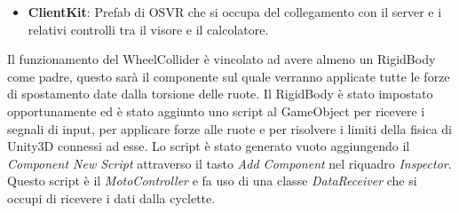 \begin{itemize}
\begin{itemize}
\begin{itemize}
					\end{itemize}
			\item \textbf{Camera}: oggetto contenente due oggetti camera.   		\begin{itemize}
  						\item \textit{TestCamera}: camera solitamente disattivata. Utilizzata solamente in test senza il visore.
			  			\item \textit{VRDisplayTracked}: il Prefab\footnote{Oggetto prefabbricato di Unity, pronto per essere importato} del visore che sostituisce un normale oggetto camera. Questo oggetto camera permettere di essere ruotata tramite i movimenti del visore.
					\end{itemize}
		\end{itemize}
	\item \textbf{ClientKit}: Prefab di OSVR che si occupa del collegamento con il server e i relativi controlli tra il visore e il calcolatore.

\end{itemize}


\noindent Il funzionamento del WheelCollider è vincolato ad avere almeno un RigidBody come padre, questo sarà il componente sul quale verranno applicate tutte le forze di spostamento date dalla torsione delle ruote. Il RigidBody è stato impostato opportunamente ed è stato aggiunto uno script al GameObject per ricevere i segnali di input, per applicare forze alle ruote e per risolvere i limiti della fisica di Unity3D connessi ad esse. Lo script è stato generato vuoto aggiungendo il \textit{Component New Script} attraverso il tasto \textit{Add Component} nel riquadro \textit{Inspector}. Questo script è il \textit{MotoController} e fa uso di una classe \textit{DataReceiver} che si occupi di ricevere i dati dalla cyclette.

\newpage
